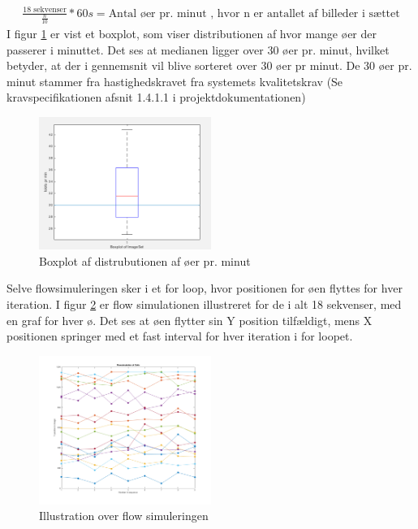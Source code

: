\begin{align}
\frac{18\text{ sekvenser}}{\frac{n}{10}} * 60s = \text{Antal øer pr. minut}
\text{ , hvor n er antallet af billeder i sættet}
\label{formular:isletprmin}
\end{align} 
I figur \ref{fig:boxplot} er vist et boxplot, som viser distributionen af hvor mange øer der passerer i minuttet. Det ses at medianen ligger over 30 øer pr. minut, hvilket betyder, at der i gennemsnit vil blive sorteret over 30 øer pr minut. De 30 øer pr. minut stammer fra hastighedskravet fra systemets kvalitetskrav (Se kravspecifikationen afsnit 1.4.1.1 i projektdokumentationen) 

 \begin{figure}[H]
	\centering
	\includegraphics[width=0.5\textwidth]{billeder/software/boxplot.png}
	\caption{Boxplot af distrubutionen af øer pr. minut}
	\label{fig:boxplot}
\end{figure}

Selve flowsimuleringen sker i et for loop, hvor positionen for øen flyttes for hver iteration. I figur \ref{fig:flowsim} er flow simulationen illustreret for de i alt 18 sekvenser, med en graf for hver ø. Det ses at øen flytter sin Y position tilfældigt, mens X positionen springer med et fast interval for hver iteration i for loopet.

\begin{figure}[H]
	\centering
	\includegraphics[width=0.5\textwidth]{billeder/software/Simulation.png}
	\caption{Illustration over flow simuleringen}
	\label{fig:flowsim}
\end{figure}


